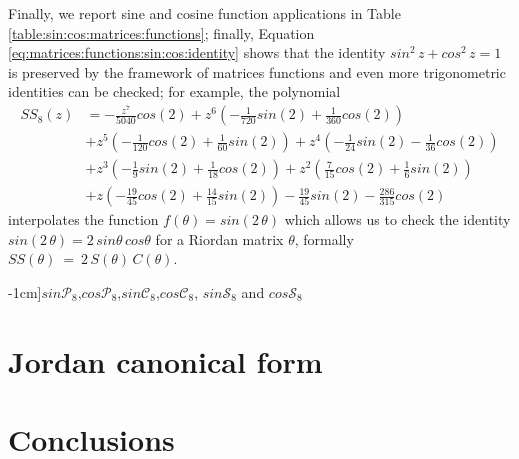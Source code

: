 Finally, we report sine and cosine function applications in Table
\ref{table:sin:cos:matrices:functions}; finally, Equation
\ref{eq:matrices:functions:sin:cos:identity} shows that the identity
$sin^{2}\,z + cos^{2}\,z=1$ is preserved by the framework of matrices functions
and even more trigonometric identities can be checked; for example, the
polynomial
\begin{displaymath}
\begin{split}
{SS_{ 8 }}{\left (z \right )} &= - \frac{z^{7}}{5040} cos{\left (2 \right )} + z^{6} \left(- \frac{1}{720} sin{\left (2 \right )} + \frac{1}{360} cos{\left (2 \right )}\right) \\
    &+ z^{5} \left(- \frac{1}{120} cos{\left (2 \right )} + \frac{1}{60} sin{\left (2 \right )}\right) + z^{4} \left(- \frac{1}{24} sin{\left (2 \right )} - \frac{1}{36} cos{\left (2 \right )}\right) \\
    &+ z^{3} \left(- \frac{1}{9} sin{\left (2 \right )} + \frac{1}{18} cos{\left (2 \right )}\right)  + z^{2} \left(\frac{7}{15} cos{\left (2 \right )} + \frac{1}{6} sin{\left (2 \right )}\right) \\
    &+ z \left(- \frac{19}{45} cos{\left (2 \right )} + \frac{14}{15} sin{\left (2 \right )}\right) - \frac{19}{45} sin{\left (2 \right )} - \frac{286}{315} cos{\left (2 \right )}
\end{split}
\end{displaymath}
interpolates the function $f(\theta)=sin(2\,\theta)$
which allows us to check the identity $sin(2\,\theta)=2\,sin\theta\,cos\theta$ 
for a Riordan matrix $\theta$, formally $SS(\theta)~=~2\,S(\theta)\,C(\theta)$.

\iffalse
In the same spirit, many other functions and their relations with already
studied ones could be an interesting field of investigation -- we would recall
that before starting the lifting process of a scalar function, the user
has to pay attention to the correct definition of the generalized Lagrange base
because it all depends on the eigenvalues of the matrix under study.
\fi


\begin{table}
    \caption[][-1cm]{$sin{\mathcal{P}_{8}}$,$cos{\mathcal{P}_{8}}$,$sin{\mathcal{C}_{8}}$,$cos{\mathcal{C}_{8}}$,
$sin{\mathcal{S}_{8}}$ and $cos{\mathcal{S}_{8}}$}

\label{table:sin:cos:matrices:functions}
\end{table}


\section{Jordan canonical form}





\section*{Conclusions}



\vfill







